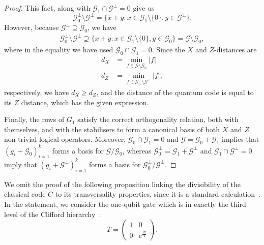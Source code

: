 \documentclass{article}
\begin{document}
\begin{proof}
    This fact, along with $\mathcal{G}_1 \cap \mathcal{G}^\perp = 0$ give us
    \begin{equation}
        \mathcal{G}_0^\perp \setminus\mathcal{G}^\perp = \{x+y:x \in \mathcal{G}_1\setminus\{0\}, y \in \mathcal{G}^\perp\}.
    \end{equation}
    However, because $\mathcal{G}^\perp \supseteq \mathcal{G}_0$, we have
    \begin{align}
        \mathcal{G}_0^\perp \setminus \mathcal{G}^\perp \supseteq \{x+y: x \in \mathcal{G}_1\setminus\{0\}, y \in \mathcal{G}_0\}
        = \mathcal{G}\setminus \mathcal{G}_0,
    \end{align}
    where in the equality we have used $\mathcal{G}_0 \cap \mathcal{G}_1 = 0$. Since the $X$ and $Z$-distances are
    \begin{align}
        d_X &= \min_{f \in \mathcal{G}\setminus\mathcal{G}_0}|f|\\
        d_Z &= \min_{f \in \mathcal{G}_0^\perp \setminus \mathcal{G}^\perp}|f|,
    \end{align}
    respectively, we have $d_X \geq d_Z$, and the distance of the quantum code is equal to its $Z$ distance, which has the given expression.

    Finally, the rows of $G_1$ satisfy the correct orthogonality relation, both with themselves, and with the stabilisers to form a canonical basis of both $X$ and $Z$ non-trivial logical operators. Moreover, $\mathcal{G}_0 \cap \mathcal{G}_1 = 0$ and $\mathcal{G} = \mathcal{G}_0 + \mathcal{G}_1$ implies that $(g_i + \mathcal{G}_0)_{i=1}^k$ forms a basis for $\mathcal{G}/\mathcal{G}_0$, whereas $\mathcal{G}_0^\perp = \mathcal{G}_1 + \mathcal{G}^\perp$ and $\mathcal{G}_1 \cap \mathcal{G}^\perp = 0$ imply that $(g_i +\mathcal{G}^\perp)_{i=1}^k$ forms a basis for $\mathcal{G}_0^\perp/\mathcal{G}^\perp$.
\end{proof}
We omit the proof of the following proposition linking the divisibility of the classical code $C$ to its transversality properties, since it is a standard calculation~\cite{hastings2018distillation,bravyi2012magic}. In the statement, we consider the one-qubit gate which is in exactly the third level of the Clifford hierarchy~\cite{gottesman1999demonstrating}:
\begin{equation}
    T = \begin{pmatrix}
        1 & 0\\
        0 & e^{\frac{i\pi}{4}}
    \end{pmatrix}.
\end{equation}
\end{document}
